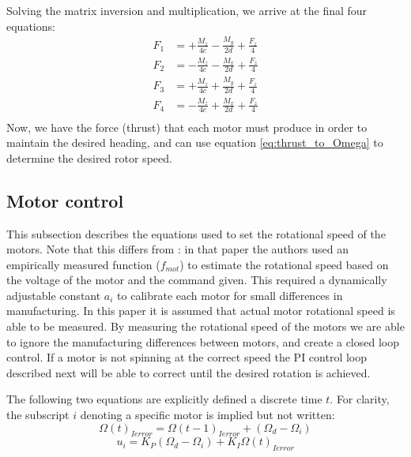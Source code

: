 \documentclass{article}
\numberwithin{equation}{section} %
\begin{document}
Solving the matrix inversion and multiplication, we arrive at the final four equations:
\begin{align}
F_1 &= +\frac{M_z}{4c} - \frac{M_y}{2d} + \frac{F_z}{4} \\
F_2 &= -\frac{M_z}{4c} - \frac{M_x}{2d} + \frac{F_z}{4} \\
F_3 &= +\frac{M_z}{4c} + \frac{M_y}{2d} + \frac{F_z}{4} \\
F_4 &= -\frac{M_z}{4c} + \frac{M_x}{2d} + \frac{F_z}{4} \\
\end{align}
Now, we have the force (thrust) that each motor must produce in order to maintain the desired heading, and can use equation \eqref{eq:thrust_to_Omega} to determine the desired rotor speed.


\subsection{Motor control} \label{subsec:motorcontrol}

This subsection describes the equations used to set the rotational speed of the motors. Note that this differs from \cite{stingu09}: in that paper the authors used an empirically measured function ($f_{mot}$) to estimate the rotational speed based on the voltage of the motor and the command given. This required a dynamically adjustable constant $a_i$ to calibrate each motor for small differences in manufacturing. In this paper it is assumed that actual motor rotational speed is able to be measured. By measuring the rotational speed of the motors we are able to ignore the manufacturing differences between motors, and create a closed loop control. If a motor is not spinning at the correct speed the PI control loop described next will be able to correct until the desired rotation is achieved.

The following two equations are explicitly defined a discrete time $t$. For clarity, the subscript $i$ denoting a specific motor is implied but not written:
\begin{equation}
	\Omega \left(t \right)_{ Ierror} = \Omega \left(t-1 \right)_{ Ierror} + \left( \Omega_{d} - \Omega_i \right)
\end{equation}
\begin{equation}
	u_i = K_{P} \left( \Omega_{d} - \Omega_i \right) + K_{I} \Omega \left(t \right) _{Ierror}
\end{equation}
\end{document}
